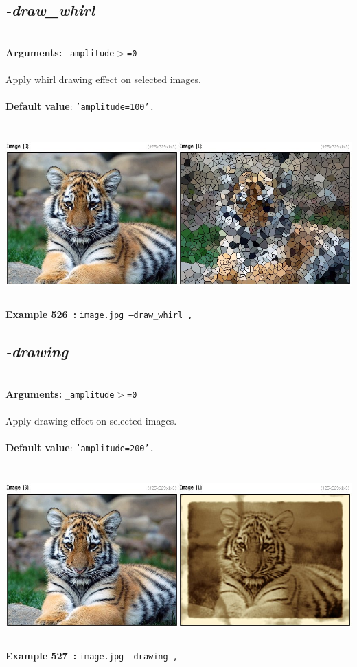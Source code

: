 \documentclass[a4paper,11pt,twoside]{book}
\begin{document}
\subsection{\emph{-draw\_whirl} }\vspace*{-0.5em}
~\\\textbf{Arguments: } 
{\small \texttt{\_amplitude$>$=0}}\\~\\
Apply whirl drawing effect on selected images.
~\\~\\\textbf{Default value}: {\small \texttt{'amplitude=100'.}}
\begin{center}\includegraphics[keepaspectratio=true,height=7cm,width=\textwidth]{img/gmic_def526.jpg}\\
{\footnotesize \textbf{Example 526~:} \texttt{image.jpg --draw\_whirl ,}}
\end{center}

\subsection{\emph{-drawing} }\vspace*{-0.5em}
~\\\textbf{Arguments: } 
{\small \texttt{\_amplitude$>$=0}}\\~\\
Apply drawing effect on selected images.
~\\~\\\textbf{Default value}: {\small \texttt{'amplitude=200'.}}
\begin{center}\includegraphics[keepaspectratio=true,height=7cm,width=\textwidth]{img/gmic_def527.jpg}\\
{\footnotesize \textbf{Example 527~:} \texttt{image.jpg --drawing ,}}
\end{center}
\end{document}
